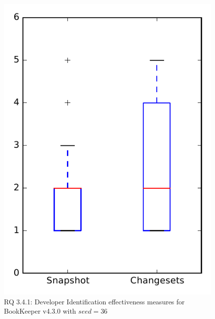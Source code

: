 
\begin{figure}
\centering
\includegraphics[height=0.4\textheight]{figures/dit_seed/rq1_bookkeeper_36}
\caption{RQ 3.4.1: Developer Identification effectiveness measures for BookKeeper v4.3.0 with $seed=36$}
\label{fig:dit_seed:rq1:bookkeeper}
\end{figure}

